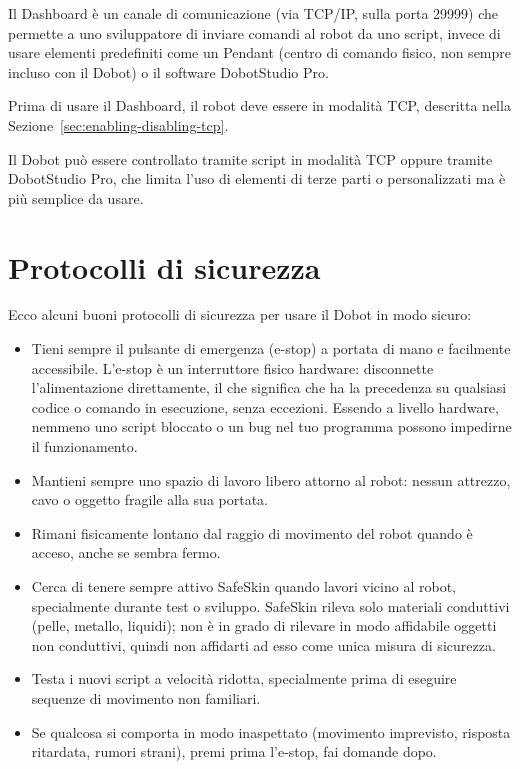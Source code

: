\documentclass[11pt,a4paper]{article}
\begin{document}
Il Dashboard è un canale di comunicazione (via TCP/IP, sulla porta 29999) che permette a uno sviluppatore di inviare comandi al robot da uno script, invece di usare elementi predefiniti come un Pendant (centro di comando fisico, non sempre incluso con il Dobot) o il software DobotStudio Pro.

Prima di usare il Dashboard, il robot deve essere in modalità TCP, descritta nella Sezione~\ref{sec:enabling-disabling-tcp}.

Il Dobot può essere controllato tramite script in modalità TCP oppure tramite DobotStudio Pro, che limita l'uso di elementi di terze parti o personalizzati ma è più semplice da usare.

\section{Protocolli di sicurezza}
\label{sec:safety}

Ecco alcuni buoni protocolli di sicurezza per usare il Dobot in modo sicuro:

\begin{itemize}[leftmargin=1.2cm]
    \item Tieni sempre il pulsante di emergenza (e-stop) a portata di mano e facilmente accessibile. L'e-stop è un interruttore fisico hardware: disconnette l'alimentazione direttamente, il che significa che ha la precedenza su qualsiasi codice o comando in esecuzione, senza eccezioni. Essendo a livello hardware, nemmeno uno script bloccato o un bug nel tuo programma possono impedirne il funzionamento.
    \item Mantieni sempre uno spazio di lavoro libero attorno al robot: nessun attrezzo, cavo o oggetto fragile alla sua portata.
    \item Rimani fisicamente lontano dal raggio di movimento del robot quando è acceso, anche se sembra fermo.
    \item Cerca di tenere sempre attivo SafeSkin quando lavori vicino al robot, specialmente durante test o sviluppo. SafeSkin rileva solo materiali conduttivi (pelle, metallo, liquidi); non è in grado di rilevare in modo affidabile oggetti non conduttivi, quindi non affidarti ad esso come unica misura di sicurezza.
    \item Testa i nuovi script a velocità ridotta, specialmente prima di eseguire sequenze di movimento non familiari.
    \item Se qualcosa si comporta in modo inaspettato (movimento imprevisto, risposta ritardata, rumori strani), premi prima l'e-stop, fai domande dopo.
\end{itemize}
\end{document}
